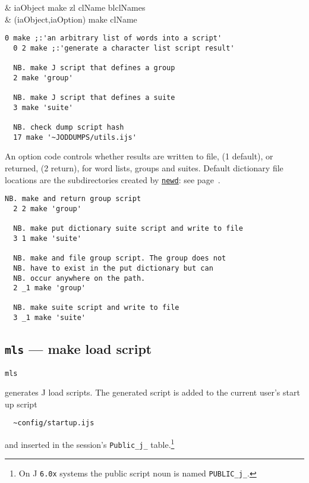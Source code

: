 \begin{wordhead}
\dyad & iaObject make zl \argsep clName \argsep blclNames \\
      & (iaObject,iaOption) make clName \\
\end{wordhead}
\begin{lstlisting}[frame=single,framerule=0pt] 
  0 make ;:'an arbitrary list of words into a script'
  0 2 make ;:'generate a character list script result' 

  NB. make J script that defines a group
  2 make 'group' 
  
  NB. make J script that defines a suite 
  3 make 'suite' 

  NB. check dump script hash 
  17 make '~JODDUMPS/utils.ijs'
\end{lstlisting}

An option code controls whether 
results are written to file, (1 default),
or returned, (2 return), for word lists, groups and suites.
Default dictionary file locations are the 
subdirectories created by \hyperlink{il:newd}{\texttt{newd}}: see page~\pageref{ss:newd}.

\begin{lstlisting}[frame=single,framerule=0pt] 
  NB. make and return group script
  2 2 make 'group'  
  
  NB. make put dictionary suite script and write to file 
  3 1 make 'suite'  

  NB. make and file group script. The group does not
  NB. have to exist in the put dictionary but can
  NB. occur anywhere on the path. 
  2 _1 make 'group'

  NB. make suite script and write to file 
  3 _1 make 'suite' 
\end{lstlisting}


\subsection{\texttt{mls} --- make load script}\label{ss:mls} 

\hypertarget{il:mls}{\texttt{mls}} generates J 
load scripts.  
The generated script is added 
to the current user's start up script
\begin{verbatim}
  ~config/startup.ijs
\end{verbatim}
and inserted in the session's \verb|Public_j_| table.\footnote{On J 
\texttt{6.0x} systems the public script noun is named \texttt{PUBLIC\_j\_}.}

